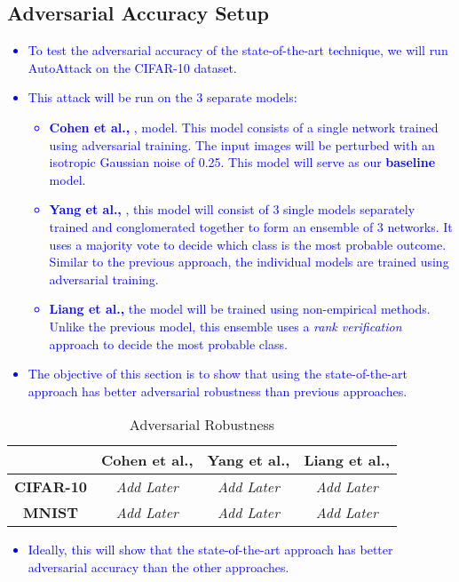 \documentclass{article}
\begin{document}
\subsection{Adversarial Accuracy Setup}
\textcolor{blue}{
\begin{itemize}
    \item To test the adversarial accuracy of the state-of-the-art technique, we will run AutoAttack on the CIFAR-10 dataset. 
    \item This attack will be run on the 3 separate models:
    \begin{itemize}
            \item \textbf{Cohen et al.,} \cite{reference4}, model. This model consists of a single network trained using adversarial training. The input images will be perturbed with an isotropic Gaussian noise of 0.25. This model will serve as our \textbf{baseline} model.
            \item \textbf{Yang et al.,} \cite{reference6}, this model will consist of 3 single models separately trained and conglomerated together to form an ensemble of 3 networks. It uses a majority vote to decide which class is the most probable outcome. Similar to the previous approach, the individual models are trained using adversarial training.
            \item \textbf{Liang et al.,} the model will be trained using non-empirical methods. Unlike the previous model, this ensemble uses a \textit{rank verification} approach to decide the most probable class.
        \end{itemize}
        \item The objective of this section is to show that using the state-of-the-art approach has better adversarial robustness than previous approaches. 
\end{itemize}
}
\begin{table}[htb]
    \centering
    \begin{tabular}{|c|c|c|c|} \hline 
        
        \textbf{ } & \textbf{Cohen et al.,} & \textbf{Yang et al.,} & \textbf{Liang et al.,} \\ \hline 
        
        \textbf{CIFAR-10} & \textit{Add Later} &\textit{Add Later}  &\textit{Add Later} \\ \hline 
        
        \textbf{MNIST} & \textit{Add Later} &\textit{Add Later}  &\textit{Add Later} \\ \hline

        
    \end{tabular}
    \caption{Adversarial Robustness}
    \label{tab:example}
\end{table}
\textcolor{blue}{
\begin{itemize}
    \item Ideally, this will show that the state-of-the-art approach has better adversarial accuracy than the other approaches.
\end{itemize}
}



\end{document}
